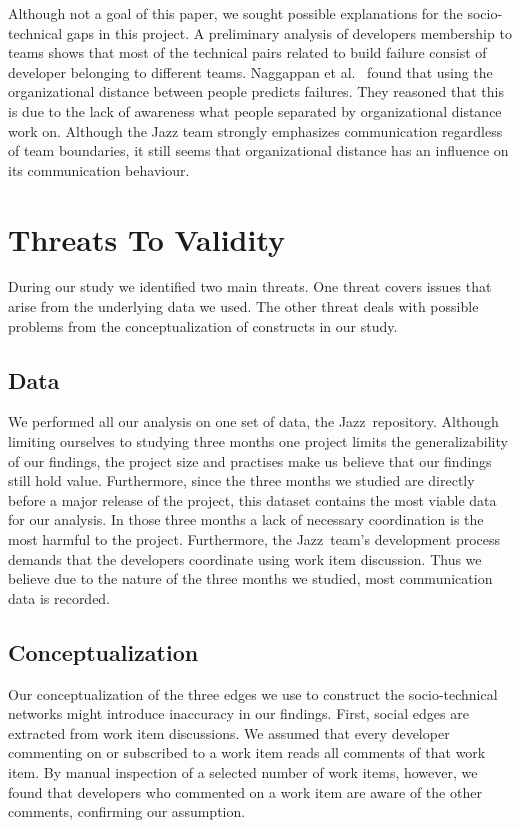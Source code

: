 \documentclass[conference]{IEEEtran}
\begin{document}
Although not a goal of this paper, we sought possible explanations for the
socio-technical gaps in this project. A preliminary analysis of developers
membership to teams shows that most
of the technical pairs related to build failure consist of developer belonging to
different teams. Naggappan et al.~\cite{nagappan:icse:2008} found that using the
organizational distance between people predicts failures. They reasoned that this
is due to the lack of awareness what people separated by organizational distance
work on. Although the Jazz team strongly emphasizes communication
regardless of team boundaries, it still seems that organizational distance has
an influence on its communication behaviour.


\section{Threats To Validity}
\label{sec:threats}
During our study we identified two main threats. 
One threat covers issues that arise from the underlying data we used.
The other threat deals with possible problems from the conceptualization of
constructs in our study.

\subsection{Data}
We performed all our analysis on one set of data, the Jazz\texttrademark\
repository. 
Although limiting ourselves to studying three months one project limits the generalizability of our findings, the  
project size and practises make us believe that our findings still hold value.
Furthermore, since the three months  we studied are directly before a major release of the project, this dataset contains the most viable data for our analysis. In those three months a lack of necessary coordination is the most harmful to the project.
Furthermore, the Jazz\texttrademark\ team's development process demands that the developers
coordinate using work item discussion. 
Thus we believe due to the nature of the three months we studied, most communication data is recorded.

\subsection{Conceptualization}
Our conceptualization of the three edges we use to construct the socio-technical networks might introduce inaccuracy in our findings.
First, social edges are extracted from work item discussions. 
We assumed that every developer commenting on or subscribed to a work item reads all comments of that work item. 
By manual inspection of a selected number of work items, however, we found that developers who commented on a work item are aware of the other comments, confirming our assumption.
\end{document}
